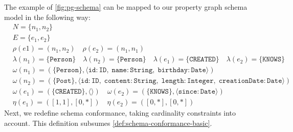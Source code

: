 \documentclass{report}
\theoremstyle{definition}
\begin{document}
The example of \autoref{fig:pg-schema} can be mapped to our property graph schema model in the following way:
\begin{align*}
  &N = \{n_1, n_2\}\\
  &E = \{e_1, e_2\}\\
  &\rho(e1) = (n_1, n_2) \quad \rho(e_2) = (n_1, n_1)\\
  &\lambda(n_1) = \{\texttt{Person}\} \quad \lambda(n_2) = \{\texttt{Person}\} \quad \lambda(e_1) = \{\texttt{CREATED}\} \quad \lambda(e_2) = \{\texttt{KNOWS}\}\\
  &\omega(n_1) = (\{\texttt{Person}\}, \langle \texttt{id} : \texttt{ID},\;\texttt{name} : \texttt{String},\;\texttt{birthday} : \texttt{Date} \rangle)\\
  &\omega(n_2) = (\{\texttt{Post}\}, \langle \texttt{id} : \texttt{ID},\;\texttt{content} : \texttt{String},\;\texttt{length} : \texttt{Integer},\;\texttt{creationDate} : \texttt{Date} \rangle)\\
  &\omega(e_1) = (\{\texttt{CREATED}\}, \langle\rangle) \quad \omega(e_2) = (\{\texttt{KNOWS}\}, \langle \texttt{since} : \texttt{Date} \rangle)\\
  &\eta(e_1) = ([1, 1], [0, *]) \quad \eta(e_2) = ([0, *], [0, *])
\end{align*}
Next, we redefine schema conformance, taking cardinality constraints into account. This definition subsumes \autoref{def:schema-conformance-basic}.
\end{document}
